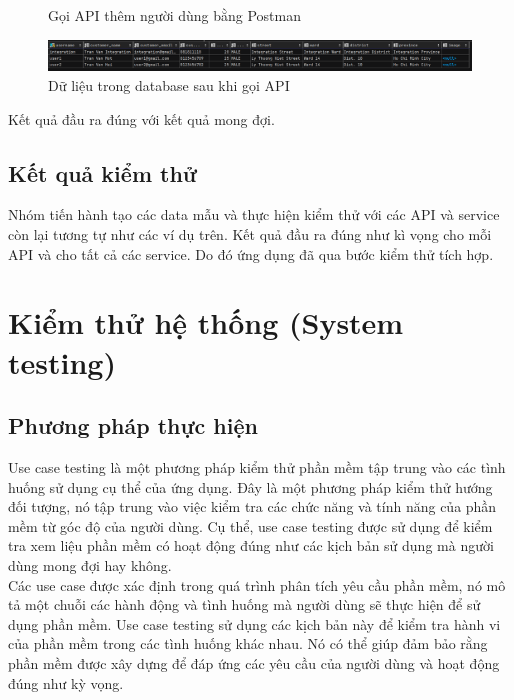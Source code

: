 \begin{itemize}
\begin{itemize}
\begin{figure}[!htp]
\begin{center}
            \end{center}
            \caption{Gọi API thêm người dùng bằng Postman}
        \end{figure}
        \begin{figure}[!htp]
            \begin{center}
                \includegraphics[width=15cm]{img/testing/inte_got_db_2.PNG}
            \end{center}
            \caption{Dữ liệu trong database sau khi gọi API}
        \end{figure}
        Kết quả đầu ra đúng với kết quả mong đợi.
    \end{itemize}
\end{itemize}

\subsection{Kết quả kiểm thử}

Nhóm tiến hành tạo các data mẫu và thực hiện kiểm thử với các API và service còn lại tương tự như các ví dụ trên. Kết quả đầu ra đúng như kì vọng cho mỗi API và cho tất cả các service. Do đó ứng dụng đã qua bước kiểm thử tích hợp.

\section{Kiểm thử hệ thống (System testing)}
\subsection{Phương pháp thực hiện}

Use case testing là một phương pháp kiểm thử phần mềm tập trung vào các tình huống sử dụng cụ thể của ứng dụng. Đây là một phương pháp kiểm thử hướng đối tượng, nó tập trung vào việc kiểm tra các chức năng và tính năng của phần mềm từ góc độ của người dùng. Cụ thể, use case testing được sử dụng để kiểm tra xem liệu phần mềm có hoạt động đúng như các kịch bản sử dụng mà người dùng mong đợi hay không.\\

Các use case được xác định trong quá trình phân tích yêu cầu phần mềm, nó mô tả một chuỗi các hành động và tình huống mà người dùng sẽ thực hiện để sử dụng phần mềm. Use case testing sử dụng các kịch bản này để kiểm tra hành vi của phần mềm trong các tình huống khác nhau. Nó có thể giúp đảm bảo rằng phần mềm được xây dựng để đáp ứng các yêu cầu của người dùng và hoạt động đúng như kỳ vọng.\\

